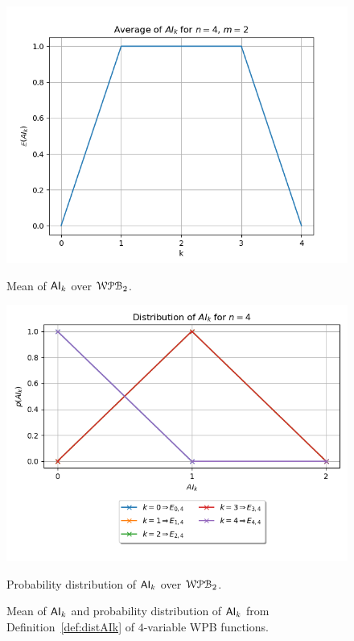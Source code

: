 \documentclass[11pt]{llncs}
\begin{document}
\begin{figure}[ht]
    \centering
    \begin{minipage}[b]{0.45\textwidth}
        \centering
        \includegraphics[width=\textwidth]{images/WPB_2_sample_size_full_dist.png}
        \caption{Mean of $\mathsf{AI}_{k}$ over $\mathcal{WPB}_{2}$.}
        \label{fig:averagesFullDist}
    \end{minipage}
    \hfill
    \begin{minipage}[b]{0.5\textwidth}
        \centering
        \includegraphics[width=\textwidth]{images/WPB_2_sample_size_full_dist_prob.png}
        \caption{Probability distribution of $\mathsf{AI}_{k}$  over $\mathcal{WPB}_{2}$.}
        \label{fig:probFullDist}
    \end{minipage}
    \caption{Mean of $\mathsf{AI}_{k}$ and probability distribution of $\mathsf{AI}_{k}$ from Definition~\ref{def:distAIk} of $4$-variable WPB functions.}
    \label{fig:dullDist}
\end{figure}
\end{document}
